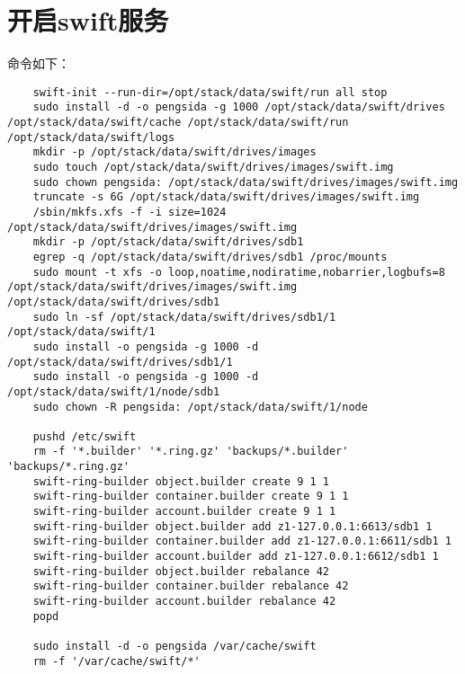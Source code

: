 \documentclass[a4paper,left=1.5cm,right=1.5cm,11pt]{article}
\begin{document}
\section{开启swift服务}
	命令如下：
	\begin{lstlisting}
	swift-init --run-dir=/opt/stack/data/swift/run all stop
	sudo install -d -o pengsida -g 1000 /opt/stack/data/swift/drives /opt/stack/data/swift/cache /opt/stack/data/swift/run /opt/stack/data/swift/logs
	mkdir -p /opt/stack/data/swift/drives/images
	sudo touch /opt/stack/data/swift/drives/images/swift.img
	sudo chown pengsida: /opt/stack/data/swift/drives/images/swift.img
	truncate -s 6G /opt/stack/data/swift/drives/images/swift.img
	/sbin/mkfs.xfs -f -i size=1024 /opt/stack/data/swift/drives/images/swift.img
	mkdir -p /opt/stack/data/swift/drives/sdb1
	egrep -q /opt/stack/data/swift/drives/sdb1 /proc/mounts
	sudo mount -t xfs -o loop,noatime,nodiratime,nobarrier,logbufs=8 /opt/stack/data/swift/drives/images/swift.img /opt/stack/data/swift/drives/sdb1
	sudo ln -sf /opt/stack/data/swift/drives/sdb1/1 /opt/stack/data/swift/1
	sudo install -o pengsida -g 1000 -d /opt/stack/data/swift/drives/sdb1/1
	sudo install -o pengsida -g 1000 -d /opt/stack/data/swift/1/node/sdb1
	sudo chown -R pengsida: /opt/stack/data/swift/1/node

	pushd /etc/swift
	rm -f '*.builder' '*.ring.gz' 'backups/*.builder' 'backups/*.ring.gz'
	swift-ring-builder object.builder create 9 1 1
	swift-ring-builder container.builder create 9 1 1
	swift-ring-builder account.builder create 9 1 1
	swift-ring-builder object.builder add z1-127.0.0.1:6613/sdb1 1
	swift-ring-builder container.builder add z1-127.0.0.1:6611/sdb1 1
	swift-ring-builder account.builder add z1-127.0.0.1:6612/sdb1 1
	swift-ring-builder object.builder rebalance 42
	swift-ring-builder container.builder rebalance 42
	swift-ring-builder account.builder rebalance 42
	popd

	sudo install -d -o pengsida /var/cache/swift
	rm -f '/var/cache/swift/*'
	\end{lstlisting}
\end{document}
